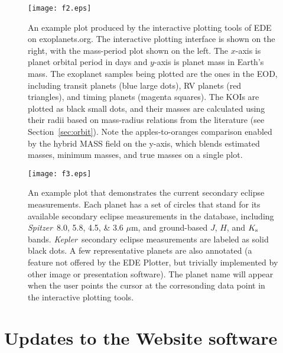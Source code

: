\documentclass[11pt,preprint]{aastex}
\def\micron{$\mu$m}
\def\kepler{\textit{Kepler}}
\def\spitzer{\textit{Spitzer}}
\def\micron{$\mu$m}
\begin{document}
\begin{CJK*}{UTF8}{gbsn}
\begin{figure}[!htb]
\centering
\texttt{[image: f2.eps]}
\caption{
  An example plot produced by the interactive plotting tools of
  EDE on exoplanets.org. The interactive plotting interface is shown
  on the right, with the mass-period plot shown on the left. The
  $x$-axis is planet orbital period in days and $y$-axis is planet
  mass in Earth's mass. The exoplanet samples being plotted are the
  ones in the EOD, including transit planets (blue large dots), RV
  planets (red triangles), and timing planets (magenta squares). The
  KOIs are plotted as black small dots, and their masses are
  calculated using their radii based on mass-radius relations from the
  literature (see Section~\ref{sec:orbit}).  Note the
  apples-to-oranges comparison enabled by the hybrid MASS field on the y-axis, which blends estimated
  masses, minimum masses, and true masses on a single plot.}
\label{fig:koi}
\end{figure}

\begin{figure}[!htb]
\centering
\texttt{[image: f3.eps]}
\caption{An example plot that demonstrates the current secondary
  eclipse measurements. Each planet has a set of circles that stand
  for its available secondary eclipse measurements in the database,
  including \spitzer\ 8.0, 5.8, 4.5, \& 3.6 \micron, and ground-based
  $J$, $H$, and $K_{\rm s}$ bands. \kepler\ secondary eclipse measurements
  are labeled as solid black dots. A few representative planets are
  also annotated (a feature not offered by the EDE Plotter, but
  trivially implemented by other image or presentation software). The
  planet name will appear when the user points the cursor at the
  corresonding data point in the interactive plotting tools.}
\label{fig:se}
\end{figure}


\section{Updates to the Website software}\label{sec:website}


\end{CJK*}
\end{document}
